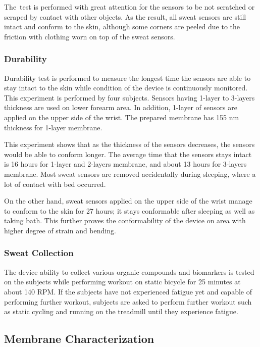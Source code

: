 \documentclass[journal]{IEEEtran}
\begin{document}
The\ test is performed with great attention for the sensors to be not scratched or scraped by contact with other objects. As the result, all sweat sensors are still intact and conform to the skin, although some corners are peeled due to the friction with clothing worn on top of the sweat sensors.

\subsubsection{Durability}

Durability test is performed to measure the longest time the sensors are able to stay intact to the skin while condition of the device is continuously monitored. This experiment is performed by four subjects. Sensors having 1-layer to 3-layers thickness are used on lower forearm area. In addition, 1-layer of sensors are applied on the upper side of the wrist. The prepared membrane has 155 nm thickness for 1-layer membrane.

This experiment shows that as the thickness of the sensors decreases, the sensors would be able to conform longer. The average time that the sensors stays intact is 16 hours for 1-layer and 2-layers membrane, and about 13 hours for 3-layers membrane. Most sweat sensors are removed accidentally during sleeping, where a lot of contact with bed occurred.

On the other hand, sweat sensors applied on the upper side of the wrist manage to conform to the skin for 27 hours; it stays conformable after sleeping as well as taking bath. This further proves the conformability of the device on area with higher degree of strain and bending.

\subsubsection{Sweat Collection}

The device ability to collect various organic compounds and biomarkers is tested on the subjects while performing workout on static bicycle for 25 minutes at about 140 RPM. If the subjects have not experienced fatigue yet and capable of performing further workout, subjects are asked to perform further workout such as static cycling and running on the treadmill until they experience fatigue.

\subsection{Membrane Characterization}
\end{document}

